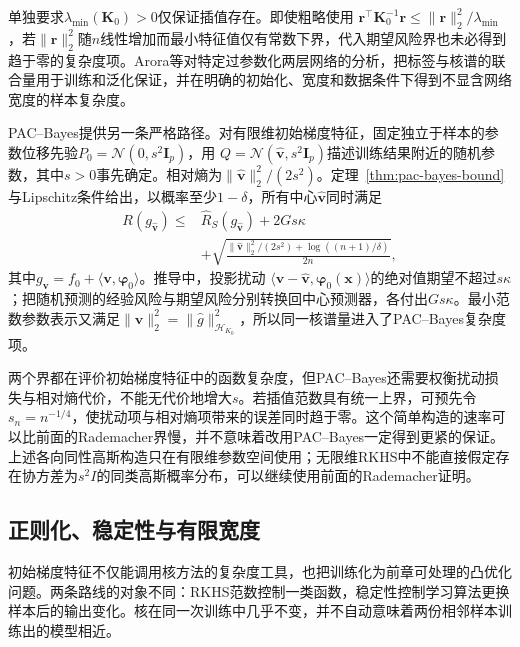单独要求$\lambda_{\min}(\bm K_0)>0$仅保证插值存在。即使粗略使用
$\bm r^\top\bm K_0^{-1}\bm r\leq\|\bm r\|_2^2/\lambda_{\min}$，若$\|\bm r\|_2^2$随$n$线性增加而最小特征值仅有常数下界，代入期望风险界也未必得到趋于零的复杂度项。Arora等对特定过参数化两层网络的分析，把标签与核谱的联合量用于训练和泛化保证，并在明确的初始化、宽度和数据条件下得到不显含网络宽度的样本复杂度。

PAC--Bayes提供另一条严格路径。对有限维初始梯度特征，固定独立于样本的参数位移先验$P_0=\mathcal N(0,s^2\bm I_p)$，用
$Q=\mathcal N(\widehat{\bm v},s^2\bm I_p)$描述训练结果附近的随机参数，其中$s>0$事先确定。相对熵为$\|\widehat{\bm v}\|_2^2/(2s^2)$。定理~\ref{thm:pac-bayes-bound}与Lipschitz条件给出，以概率至少$1-\delta$，所有中心$\widehat{\bm v}$同时满足
\begin{equation}
 \begin{aligned}
 R(g_{\widehat{\bm v}})\leq{}&\hat R_S(g_{\widehat{\bm v}})+2Gs\kappa\\
 &+\sqrt{\frac{\|\widehat{\bm v}\|_2^2/(2s^2)+\log((n+1)/\delta)}{2n}},
 \end{aligned}
 \label{eq:ntk-pac-bayes-risk}
\end{equation}
其中$g_{\bm v}=f_0+\langle\bm v,\bm\varphi_0\rangle$。推导中，投影扰动
$\langle\bm v-\widehat{\bm v},\bm\varphi_0(\bm x)\rangle$的绝对值期望不超过$s\kappa$；把随机预测的经验风险与期望风险分别转换回中心预测器，各付出$Gs\kappa$。最小范数参数表示又满足$\|\widehat{\bm v}\|_2^2=\|\widehat g\|_{\mathcal H_{K_0}}^2$，所以同一核谱量进入了PAC--Bayes复杂度项。

两个界都在评价初始梯度特征中的函数复杂度，但PAC--Bayes还需要权衡扰动损失与相对熵代价，不能无代价地增大$s$。若插值范数具有统一上界，可预先令$s_n=n^{-1/4}$，使扰动项与相对熵项带来的误差同时趋于零。这个简单构造的速率可以比前面的Rademacher界慢，并不意味着改用PAC--Bayes一定得到更紧的保证。上述各向同性高斯构造只在有限维参数空间使用；无限维RKHS中不能直接假定存在协方差为$s^2I$的同类高斯概率分布，可以继续使用前面的Rademacher证明。

\subsection{正则化、稳定性与有限宽度}

初始梯度特征不仅能调用核方法的复杂度工具，也把训练化为前章可处理的凸优化问题。两条路线的对象不同：RKHS范数控制一类函数，稳定性控制学习算法更换样本后的输出变化。核在同一次训练中几乎不变，并不自动意味着两份相邻样本训练出的模型相近。

